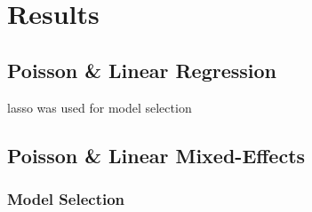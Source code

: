 \section{Results}
\subsection{Poisson \& Linear Regression}
lasso was used for model selection
\subsection{Poisson \& Linear Mixed-Effects}
\subsubsection{Model Selection}

